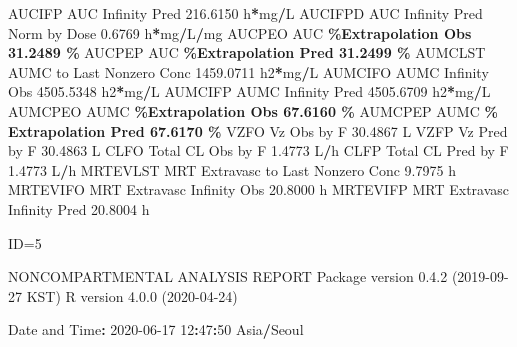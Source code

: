 \documentclass[
  12pt,
]{krantz}
\newenvironment{Shaded}{\begin{snugshade}}{\end{snugshade}}
\newcommand{\DecValTok}[1]{\textcolor[rgb]{0.00,0.00,0.81}{#1}}
\newcommand{\FloatTok}[1]{\textcolor[rgb]{0.00,0.00,0.81}{#1}}
\newcommand{\NormalTok}[1]{#1}
\newcommand{\OperatorTok}[1]{\textcolor[rgb]{0.81,0.36,0.00}{\textbf{#1}}}
\newcommand{\StringTok}[1]{\textcolor[rgb]{0.31,0.60,0.02}{#1}}
\begin{document}
\begin{Shaded}
\begin{Highlighting}[]
\NormalTok{AUCIFP     AUC Infinity Pred                             }\FloatTok{216.6150}\NormalTok{ h}\OperatorTok{*}\NormalTok{mg}\OperatorTok{/}\NormalTok{L}
\NormalTok{AUCIFPD    AUC Infinity Pred Norm by Dose                  }\FloatTok{0.6769}\NormalTok{ h}\OperatorTok{*}\NormalTok{mg}\OperatorTok{/}\NormalTok{L}\OperatorTok{/}\NormalTok{mg}
\NormalTok{AUCPEO     AUC }\OperatorTok{\%Extrapolation Obs                         31.2489 \%}
\NormalTok{AUCPEP     AUC }\OperatorTok{\%Extrapolation Pred                        31.2499 \%}
\NormalTok{AUMCLST    AUMC to Last Nonzero Conc                    }\FloatTok{1459.0711}\NormalTok{ h2}\OperatorTok{*}\NormalTok{mg}\OperatorTok{/}\NormalTok{L}
\NormalTok{AUMCIFO    AUMC Infinity Obs                            }\FloatTok{4505.5348}\NormalTok{ h2}\OperatorTok{*}\NormalTok{mg}\OperatorTok{/}\NormalTok{L}
\NormalTok{AUMCIFP    AUMC Infinity Pred                           }\FloatTok{4505.6709}\NormalTok{ h2}\OperatorTok{*}\NormalTok{mg}\OperatorTok{/}\NormalTok{L}
\NormalTok{AUMCPEO    AUMC }\OperatorTok{\%Extrapolation Obs                        67.6160 \%}
\NormalTok{AUMCPEP    AUMC }\OperatorTok{\% Extrapolation Pred                      67.6170 \%}
\NormalTok{VZFO       Vz Obs by F                                    }\FloatTok{30.4867}\NormalTok{ L}
\NormalTok{VZFP       Vz Pred by F                                   }\FloatTok{30.4863}\NormalTok{ L}
\NormalTok{CLFO       Total CL Obs by F                               }\FloatTok{1.4773}\NormalTok{ L}\OperatorTok{/}\NormalTok{h}
\NormalTok{CLFP       Total CL Pred by F                              }\FloatTok{1.4773}\NormalTok{ L}\OperatorTok{/}\NormalTok{h}
\NormalTok{MRTEVLST   MRT Extravasc to Last Nonzero Conc              }\FloatTok{9.7975}\NormalTok{ h}
\NormalTok{MRTEVIFO   MRT Extravasc Infinity Obs                     }\FloatTok{20.8000}\NormalTok{ h}
\NormalTok{MRTEVIFP   MRT Extravasc Infinity Pred                    }\FloatTok{20.8004}\NormalTok{ h}





\NormalTok{ID=}\DecValTok{5}

\NormalTok{                        NONCOMPARTMENTAL ANALYSIS REPORT}
\NormalTok{                       Package version }\DecValTok{0}\NormalTok{.}\FloatTok{4.2}\NormalTok{ (}\DecValTok{2019{-}09{-}27}\NormalTok{ KST)}
\NormalTok{                          R version }\DecValTok{4}\NormalTok{.}\FloatTok{0.0}\NormalTok{ (}\DecValTok{2020{-}04{-}24}\NormalTok{)}

\NormalTok{Date and Time}\OperatorTok{:}\StringTok{ }\DecValTok{2020{-}06{-}17} \DecValTok{12}\OperatorTok{:}\DecValTok{47}\OperatorTok{:}\DecValTok{50}\NormalTok{ Asia}\OperatorTok{/}\NormalTok{Seoul}


\end{Highlighting}
\end{Shaded}
\end{document}
